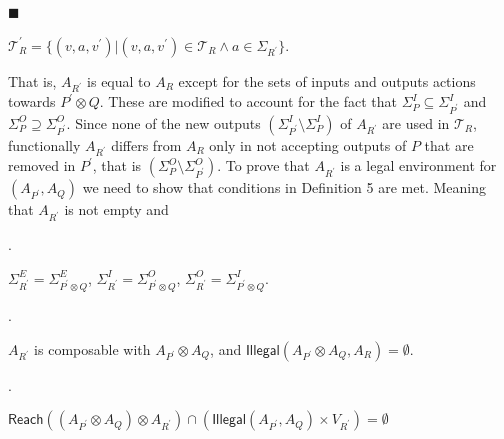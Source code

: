  
 
\par\noindent  $\blacksquare$ 
 
$\mathcal{T}^{\prime}_{R}=\{(v,a,v^{\prime})|(v,a,v^{\prime})\in\mathcal{T}_{R}\land a\in\Sigma_{R^{\prime}}\}$.\par
 
 
  
 
 
That is, $A_{R^{\prime}}$ is equal to $A_{R}$ except for the sets of inputs and outputs actions towards $P^{\prime}\otimes Q$. These are modified to account for the fact that $\Sigma_{P}^{I}\subseteq\Sigma_{P^{\prime}}^{I}$ and $\Sigma_{P}^{O}\supseteq\Sigma_{P^{\prime}}^{O}$. Since none of the new outputs $(\Sigma_{P^{\prime}}^{I}\setminus\Sigma_{P}^{I})$ of $A_{R^{\prime}}$ are used in $\mathcal{T}_{R}$, functionally $A_{R^{\prime}}$ differs from $A_{R}$ only in not accepting outputs of $P$ that are removed in $P^{\prime}$, that is $(\Sigma_{P}^{O}\setminus\Sigma_{P^{\prime}}^{O})$. To prove that $A_{R^{\prime}}$ is a legal environment for $(A_{P^{\prime}},A_{Q})$ we need to show that conditions in Definition 5 are met. Meaning that $A_{R^{\prime}}$ is not empty and\par
  
\par{}. 
 
$\Sigma_{R^{\prime}}^{E}=\Sigma_{P^{\prime}\otimes Q}^{E}$, $\Sigma_{R^{\prime}}^{I}=\Sigma_{P^{\prime}\otimes Q}^{O}$, $\Sigma_{R^{\prime}}^{O}=\Sigma_{P^{\prime}\otimes Q}^{I}$.\par
 
 
 
\par{}. 
 
$A_{R^{\prime}}$ is composable with $A_{P^{\prime}}\otimes A_{Q}$, and $\mathsf{Illegal}(A_{P^{\prime}}\otimes A_{Q},A_{R})=\emptyset$.\par
 
 
 
\par{}. 
 
$\mathsf{Reach}((A_{P^{\prime}}\otimes A_{Q})\otimes A_{R^{\prime}})\cap(\mathsf{Illegal}(A_{P^{\prime}},A_{Q})\times V_{R^{\prime}})=\emptyset$\par
 
